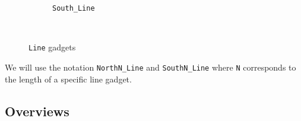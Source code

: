 \begin{figure}[H]
\begin{subfigure}[t]{0.15\textwidth}
        \caption{\label{fig:south_line} {\tt South\_Line} }
    \end{subfigure}%
    ~
    \caption{\label{fig:line_gadgets} {\tt Line} gadgets}
\end{figure}

We will use the notation {\tt NorthN\_Line} and {\tt SouthN\_Line} where {\tt N} corresponds to the length of a specific line gadget.












\subsection{Overviews}

